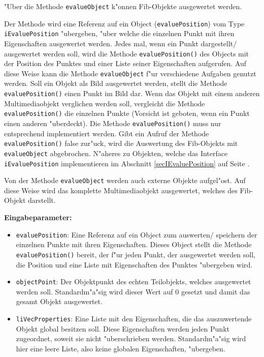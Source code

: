 \bigskip\noindent
"Uber die Methode \verb|evalueObject| k"onnen Fib-Objekte ausgewertet werden.

Der Methode wird eine Referenz auf ein Object (\verb|evaluePosition|) vom Type \verb|iEvaluePosition| "ubergeben, "uber welche die einzelnen Punkt mit ihren Eigenschaften ausgewertet werden. Jedes mal, wenn ein Punkt dargestellt/ ausgewertet werden soll, wird die Methode \verb|evaluePosition()| des Objects mit der Position des Punktes und einer Liste seiner Eigenschaften aufgerufen. Auf diese Weise kann die Methode \verb|evalueObject| f"ur verschiedene Aufgaben genutzt werden. Soll ein Objekt als Bild ausgewertet werden, stellt die Methode \verb|evaluePosition()| einen Punkt im Bild dar. Wenn das Objekt mit einem anderen Multimediaobjekt verglichen werden soll, vergleicht die Methode \verb|evaluePosition()| die einzelnen Punkte (Vorsicht ist geboten, wenn ein Punkt einen anderen "uberdeckt). Die Methode \verb|evaluePosition()| muss nur entsprechend implementiert werden.
Gibt ein Aufruf der Methode \verb|evaluePosition()| false zur"uck, wird die Auswertung des Fib-Objekts mit \verb|evalueObject| abgebrochen.
N"aheres zu Objekten, welche das Interface \verb|iEvaluePosition| implementieren im Abschnitt \ref{secIEvaluePosition} auf Seite \pageref{secIEvaluePosition} .

Von der Methode \verb|evalueObject| werden auch externe Objekte aufgel"ost. Auf diese Weise wird das komplette Multimediaobjekt ausgewertet, welches des Fib-Objekt darstellt.

\bigskip\noindent
\textbf{Eingabeparameter:} 
\begin{itemize}
 \item \verb|evaluePosition|: Eine Referenz auf ein Object zum auswerten/ speichern der einzelnen Punkte mit ihren Eigenschaften. Dieses Object stellt die Methode \verb|evaluePosition()| bereit, der f"ur jeden Punkt, der ausgewertet werden soll, die Position und eine Liste mit Eigenschaften des Punktes "ubergeben wird.
 \item \verb|objectPoint|: Der Objektpunkt des echten Teilobjekts, welches ausgewertet werden soll. Standardm"a"sig wird dieser Wert auf $0$ gesetzt und damit das gesamt Objekt ausgewertet.
 \item \verb|liVecProperties|: Eine Liste mit den Eigenschaften, die das auszuwertende Objekt global besitzen soll. Diese Eigenschaften werden jeden Punkt zugeordnet, soweit sie nicht "uberschrieben werden. Standardm"a"sig wird hier eine leere Liste, also keine globalen Eigenschaften, "ubergeben.
\end{itemize}

